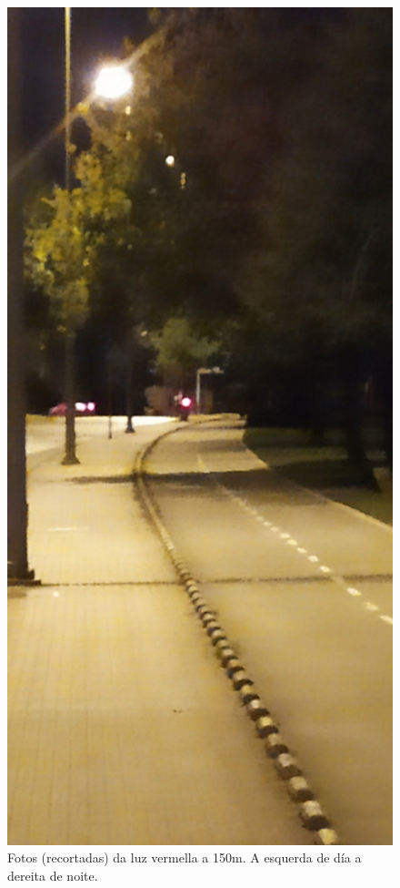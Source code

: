 \begin{figure}[tbp]
  \includegraphics[scale=0.1]{imaxes/foto-noite.png}
  \caption{Fotos (recortadas) da luz vermella a 150m. A esquerda de día a dereita de noite.}
  \label{fig:fotos_distancia}
\end{figure}

